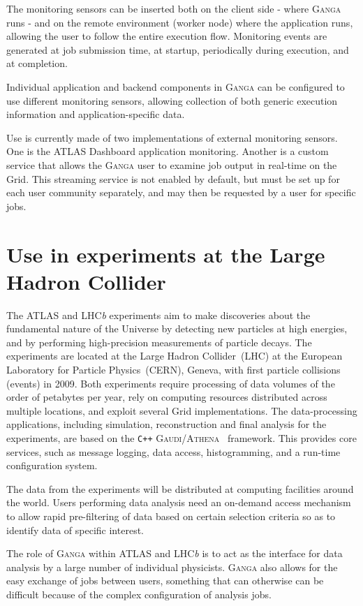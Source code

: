 \documentclass{elsart}
\def\lhcb {LHC{\em b\/}\xspace}
\def\atlas {ATLAS\xspace}
\def\lhc {LHC\xspace}
\def\ganga {\textsc{Ganga}\xspace}
\def\gaudi {\textsc{Gaudi}\xspace}
\def\athena {\textsc{Athena}\xspace}
\def\grid {Grid\xspace}
\newcommand{\code}[1]{\texttt{#1}}
\begin{document}
The monitoring sensors can be inserted both on the client side - where \ganga
runs - and on the remote environment (worker node) where the application
runs, allowing the user to follow the entire execution flow.  Monitoring
events are generated at job submission time, at startup, periodically
during execution, and at completion.

Individual application and backend components in \ganga can be configured to use
different monitoring sensors, allowing collection of both generic execution
information and application-specific data.

Use is currently made of two implementations of external monitoring sensors. One
is the \atlas Dashboard application monitoring\cite{andreeva_2008}.
Another is a custom service that allows the \ganga user to examine job output
in real-time on the \grid.  This streaming service
is not enabled by default, but must be set up for each user community separately,
and may then be requested by a user for specific jobs.

\section{Use in experiments at the Large Hadron Collider}
\label{sec:useHEP}

The \atlas and \lhcb experiments aim to make discoveries about the
fundamental nature of the Universe by detecting new particles at 
high energies, and by performing high-precision measurements of
particle decays. The experiments
are located at the Large Hadron Collider~(\lhc) at the European Laboratory for
Particle Physics~(CERN), Geneva, with first particle collisions (events) in
2009. Both experiments require processing of data
volumes of the order of petabytes per year, rely on computing resources
distributed across multiple locations, and exploit several \grid implementations. The data-processing applications,
including simulation, reconstruction and final analysis for the experiments,
are based on the \code{C++} \gaudi/\athena~\cite{gaudi} framework.  This
provides core services, such as message logging, data access, histogramming,
and a run-time configuration system. 

The data from the experiments will be distributed at computing facilities
around the world. Users performing data analysis need an on-demand access
mechanism to allow rapid pre-filtering of data based on certain selection
criteria so as to identify data of specific interest.

The role of \ganga within \atlas and \lhcb is to act as the interface for data
analysis by a large number of individual physicists. \ganga also allows for
the easy exchange of jobs between users, something that can otherwise can be difficult
because of the complex configuration of analysis jobs.
\end{document}
